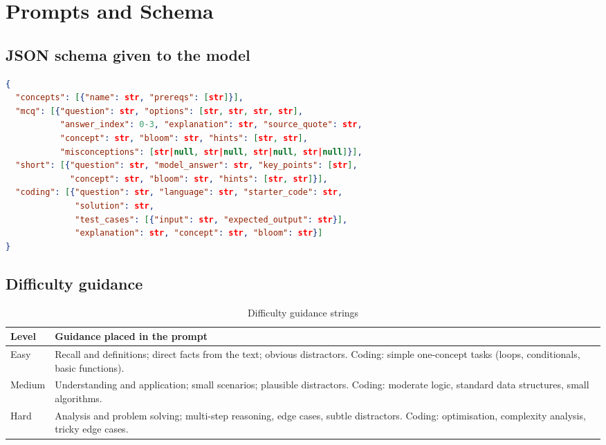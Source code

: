 \chapter{Prompts and Schema}
\label{app:prompts}

\section{JSON schema given to the model}
\begin{lstlisting}[language=JSON, caption={Schema embedded in every generation prompt}, label={lst:schema}]
{
  "concepts": [{"name": str, "prereqs": [str]}],
  "mcq": [{"question": str, "options": [str, str, str, str],
           "answer_index": 0-3, "explanation": str, "source_quote": str,
           "concept": str, "bloom": str, "hints": [str, str],
           "misconceptions": [str|null, str|null, str|null, str|null]}],
  "short": [{"question": str, "model_answer": str, "key_points": [str],
             "concept": str, "bloom": str, "hints": [str, str]}],
  "coding": [{"question": str, "language": str, "starter_code": str,
              "solution": str,
              "test_cases": [{"input": str, "expected_output": str}],
              "explanation": str, "concept": str, "bloom": str}]
}
\end{lstlisting}

\section{Difficulty guidance}
\begin{table}[H]
\centering
\begin{tabularx}{\textwidth}{@{} p{2cm} X @{}}
\toprule
\textbf{Level} & \textbf{Guidance placed in the prompt} \\
\midrule
Easy & Recall and definitions; direct facts from the text; obvious distractors. Coding: simple one-concept tasks (loops, conditionals, basic functions). \\
Medium & Understanding and application; small scenarios; plausible distractors. Coding: moderate logic, standard data structures, small algorithms. \\
Hard & Analysis and problem solving; multi-step reasoning, edge cases, subtle distractors. Coding: optimisation, complexity analysis, tricky edge cases. \\
\bottomrule
\end{tabularx}
\caption{Difficulty guidance strings}
\label{tab:difficulty}
\end{table}

